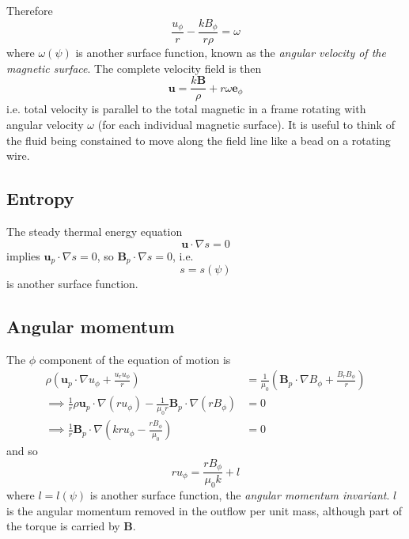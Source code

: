 \documentclass{jknotes}
\newcommand{\B}{\symbf{B}}
\renewcommand{\u}{\symbf{u}}
\begin{document}
Therefore
\begin{equation}
	\frac{u_\phi}{r} - \frac{kB_\phi}{r\rho} = \omega
\end{equation}
where $\omega(\psi)$ is another surface function, known as the \emph{angular
velocity of the magnetic surface}. The complete velocity field is then
\begin{equation}
	\u = \frac{k\B}{\rho} + r\omega \symbf{e}_\phi
\end{equation}
i.e. total velocity is parallel to the total magnetic in a frame rotating with
angular velocity $\omega$ (for each individual magnetic surface). It is useful
to think of the fluid being constained to move along the field line like a
bead on a rotating wire.

\subsection{Entropy}
The steady thermal energy equation
\begin{equation}
	\u \cdot \nabla s = 0
\end{equation}
implies $\u_p \cdot \nabla s = 0$, so $\B_p \cdot \nabla s = 0$, i.e.
\begin{equation}
	s= s(\psi)
\end{equation}
is another surface function.

\subsection{Angular momentum}
The $\phi$ component of the equation of motion is
\begin{align}
	\rho\left( \u_p \cdot \nabla u_\phi + \frac{u_r u_\phi}{r}\right) &=
	\frac{1}{\mu_0}\left(\B_p \cdot \nabla B_\phi + \frac{B_r
	B_\phi}{r}\right) \\
	\implies \frac{1}{r}\rho \u_p \cdot \nabla(ru_\phi) - \frac{1}{\mu_0 r}
	\B_p \cdot \nabla(rB_\phi) &= 0 \\
	\implies \frac{1}{r}\B_p \cdot \nabla \left( kr u_\phi -
	\frac{rB_\phi}{\mu_0}\right) &= 0
\end{align}
and so
\begin{equation}
	ru_\phi = \frac{r B_\phi}{\mu_0 k} + l
\end{equation}
where $l = l(\psi)$ is another surface function, the \emph{angular momentum
invariant}. $l$ is the angular momentum removed in the outflow per unit mass,
although part of the torque is carried by $\B$.
\end{document}
